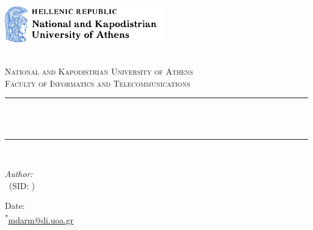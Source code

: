 \begin{titlepage}

\newcommand{\HRule}{\rule{\linewidth}{0.5mm}} %



\includegraphics[width=7cm]{./figures/NKUA-logo}\\[0.5cm]

\begin{center} %

\textsc{\LARGE \reporttype}\\[1.5cm] 
\textsc{\Large National and Kapodistrian University of Athens}\\[0.5cm] 
\textsc{\large Faculty of Informatics and Telecommunications }\\[0.5cm]

\HRule \\[0.4cm]
{ \huge \bfseries \reporttitle}\\ %
\HRule \\[1.5cm]
\end{center}

\begin{flushleft} \large
\textit{Author:}\\
\reportauthor~(SID: \sid)%
\end{flushleft}
\vspace{2cm}
\makeatletter
Date: \@date\\
\textsuperscript{*}\href{mailto:mdarm@di.uoa.gr}{mdarm@di.uoa.gr}

\vfill %



\makeatother


\end{titlepage}
